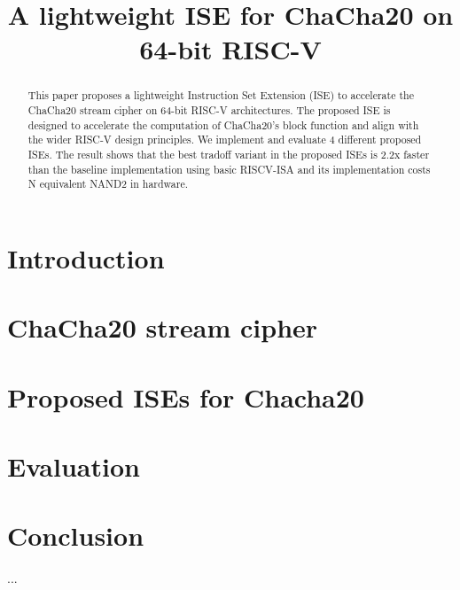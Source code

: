 \documentclass[draft]{iacrtrans}
\title{A lightweight ISE for ChaCha20 on 64-bit RISC-V}
\author{}
\begin{document}

\maketitle

\begin{abstract}
This paper proposes a lightweight Instruction Set Extension (ISE) to accelerate the ChaCha20 stream cipher on 64-bit RISC-V architectures. The proposed ISE is designed to accelerate the computation of ChaCha20's block function and align with the wider RISC-V design principles. We implement and evaluate 4 different proposed ISEs. The result shows that the best tradoff variant in the proposed ISEs is 2.2x faster than the baseline implementation using basic RISCV-ISA and its implementation costs N equivalent NAND2 in hardware.
\end{abstract}



\section{Introduction}
\label{sec:intro}


\section{ChaCha20 stream cipher}
\label{sec:bg}


\section{Proposed ISEs for Chacha20}
\label{sec:ise}


\section{Evaluation}
\label{sec:res}


\section{Conclusion}
\label{sec:outro}
...





\end{document}
